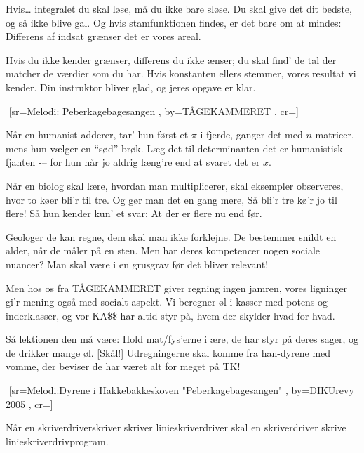 \documentclass[pdftex,12pt]{article}
\begin{document}
\begin{songs}{}
\beginverse
Hvis\ldots
integralet du skal løse,
må du ikke bare sløse.
Du skal give det dit bedste,
og så ikke blive gal.
Og hvis stamfunktionen findes,
er det bare om at mindes:
Differens af indsat grænser
det er vores areal.

\endverse
\beginverse
Hvis du ikke kender grænser,
differens du ikke ænser;
du skal find’ de tal der matcher
de værdier som du har.
Hvis konstanten ellers stemmer,
vores resultat vi kender.
Din instruktor bliver glad,
og jeres opgave er klar.

\endverse
\endsong



﻿%
[sr={Melodi: Peberkagebagesangen}
,
by={TÅGEKAMMERET}
,
cr={}]\hypertarget{Når en humanist adderer}{}
\label{song31}

\beginverse
Når en humanist adderer,
tar’ hun først et $\pi$ i fjerde,
ganger det med $n$ matricer,
mens hun vælger en ``sød'' brøk.
Læg det til determinanten
det er humanistisk fjanten -–
for hun når jo aldrig læng’re
end at svaret det er $x$.
\endverse

\beginverse
Når en biolog skal lære,
hvordan man multiplicerer,
skal eksempler observeres,
hvor to køer bli’r til tre.
Og gør man det en gang mere,
Så bli’r tre kø’r jo til flere!
Så hun kender kun’ et svar:
At der er flere nu end før.
\endverse

\beginverse
Geologer de kan regne,
dem skal man ikke forklejne.
De bestemmer snildt en alder,
når de måler på en sten.
Men har deres kompetencer
nogen sociale nuancer?
Man skal være i en grusgrav
før det bliver relevant!
\endverse

\beginverse
Men hos os fra TÅGEKAMMERET
giver regning ingen jamren,
vores ligninger gi’r mening
også med socialt aspekt.
Vi beregner øl i kasser
med potens og inderklasser,
og vor KA\$\$ har altid styr på,
hvem der skylder hvad for hvad.
\endverse

\beginverse
Så lektionen den må være:
Hold mat/fys’erne i ære,
de har styr på deres sager,
og de drikker mange øl. [Skål!]
Udregningerne skal komme
fra han-dyrene med vomme,
der beviser de har været
alt for meget på TK!
\endverse
\endsong



﻿%
[sr={Melodi:Dyrene i Hakkebakkeskoven "Peberkagebagesangen"}
,
by={DIKUrevy 2005}
,
cr={}]\hypertarget{Linieskriverdriversangen}{}
\label{song32}

\beginverse
Når en skriverdriverskriver
skriver linieskriverdriver
skal en skriverdriver skrive
linieskriverdrivprogram.


\end{songs}
\end{document}
